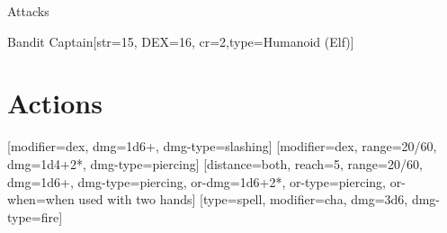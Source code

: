 \begin{ExampleBlock}{Attacks}
\begin{RpgStat}{Bandit Captain}[str=15, DEX=16, cr=2,type={Humanoid (Elf)}]
    \section{Actions}
        [modifier=dex, dmg=1d6+, dmg-type=slashing]
        [modifier=dex, range=20/60, dmg=1d4+2*, dmg-type=piercing]
        [distance=both, reach=5, range=20/60, dmg=1d6+, dmg-type=piercing,
            or-dmg=1d6+2*, or-type=piercing, or-when={when used with two hands}]
        [type=spell, modifier=cha, dmg=3d6, dmg-type=fire]
\end{RpgStat}


\end{ExampleBlock}
